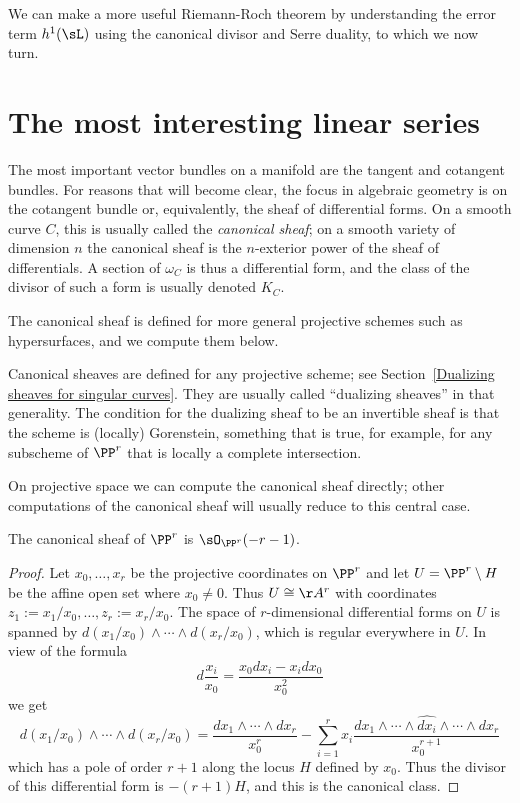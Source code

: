We can make a more useful Riemann-Roch theorem by understanding the error term $h^1(\sL)$ using
the canonical divisor and Serre duality, to which
we now turn.


\section{The most interesting linear series}

The most important vector bundles on a manifold are the tangent and cotangent bundles. For reasons that
will become clear, the focus in algebraic geometry is on the cotangent bundle or, equivalently, the sheaf of differential forms. On a smooth curve $C$, this is usually called the \emph{canonical sheaf}; on a smooth
variety of dimension $n$ the canonical sheaf is the $n$-exterior power of the sheaf of differentials. A section of 
$\omega_C$ is thus a differential form, and the class of the divisor
of such a form is usually denoted $K_C$. 

The canonical sheaf is defined for more general projective schemes such as hypersurfaces, and we compute them below.
\begin{fact}
Canonical sheaves are defined for any projective scheme; see Section~\ref{Dualizing sheaves for singular curves}. 
They are usually called ``dualizing sheaves'' in that generality. The condition for the dualizing sheaf to be an invertible
sheaf is that the scheme is (locally) Gorenstein, something that is true, for example, for any subscheme of $\PP^r$
that is locally a complete intersection.
\end{fact}
 

On projective space we can compute the canonical sheaf directly; other computations of the canonical sheaf will usually reduce to this central case.

\begin{theorem}
 The canonical sheaf of $\PP^{r}$ is $\sO_{\PP^{r}}(-r-1)$. 
\end{theorem}
\begin{proof}
Let $x_{0}, \dots, x_{r}$ be the projective coordinates on $\PP^{r}$ and let  $U = \PP^{r}\setminus H$ be the affine open set where $x_{0} \neq 0$. Thus $U \cong \AA^{r}$ with coordinates $z_{1} := x_{1}/x_{0}, \dots, z_{r}:=x_{r}/x_{0}$. The space of $r$-dimensional differential forms on $U$ is spanned by $d(x_{1}/x_{0})\wedge\cdots\wedge d(x_{r}/x_{0})$, which is regular everywhere in $U$. In view of the formula
$$
d\frac{x_{i}}{x_{0}} = \frac{x_{0}dx_{i}-x_{i}dx_{0}}{x_{0}^{2}}
$$
we get
$$
d(x_{1}/x_{0})\wedge\cdots\wedge d(x_{r}/x_{0}) = \frac{dx_{1}\wedge\cdots\wedge dx_{r}}{x_{0}^{r}}-
\sum_{i=1}^{r} x_{i} \frac{ dx_{1}\wedge\cdots \wedge \widehat{dx_{i}}\wedge \cdots \wedge dx_{r}}{x_{0}^{r+1}}
$$
which has a pole of order $r+1$ along the locus $H$ defined by $x_{0}$. Thus the divisor of this differential form
is $-(r+1)H$, and this is the canonical class.
\end{proof}


